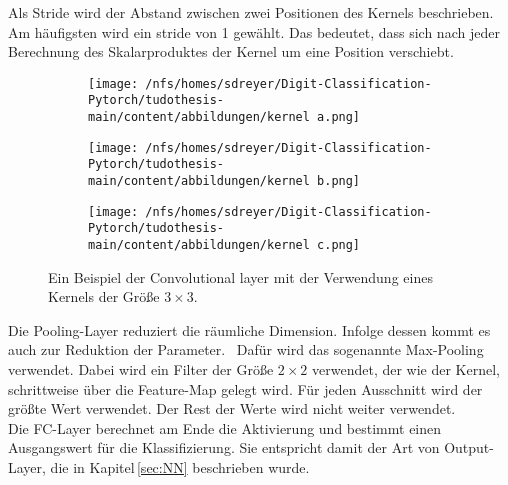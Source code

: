 Als Stride wird der Abstand zwischen zwei Positionen des Kernels beschrieben. Am häufigsten wird ein stride von 1 gewählt. 
Das bedeutet, dass sich nach jeder Berechnung des Skalarproduktes der Kernel um eine Position verschiebt.
\begin{figure}[H]
  \centering
  \begin{subfigure}[b]{0.3\textwidth}
    \texttt{[image: /nfs/homes/sdreyer/Digit-Classification-Pytorch/tudothesis-main/content/abbildungen/kernel a.png]}
    \label{}
  \end{subfigure}
  \hfill
  \begin{subfigure}[b]{0.3\textwidth}
    \texttt{[image: /nfs/homes/sdreyer/Digit-Classification-Pytorch/tudothesis-main/content/abbildungen/kernel b.png]}
    \label{}
  \end{subfigure}
  \hfill
  \begin{subfigure}[b]{0.3\textwidth}
    \texttt{[image: /nfs/homes/sdreyer/Digit-Classification-Pytorch/tudothesis-main/content/abbildungen/kernel c.png]}
    \label{}
  \end{subfigure}
  \caption{Ein Beispiel der Convolutional layer mit der Verwendung eines Kernels der Größe $3 \times 3$.~\cite{Yamashita2018}}
  \label{fig:kernel}
\end{figure}
Die Pooling-Layer reduziert die räumliche Dimension. Infolge dessen kommt es auch zur Reduktion der Parameter.~\cite{datascience}
Dafür wird das sogenannte Max-Pooling verwendet. Dabei wird ein Filter der Größe $2 \times 2$ verwendet, der wie der Kernel, schrittweise über die Feature-Map gelegt wird.
Für jeden Ausschnitt wird der größte Wert verwendet. Der Rest der Werte wird nicht weiter verwendet.~\cite{Yamashita2018}\\
Die FC-Layer berechnet am Ende die Aktivierung und bestimmt einen Ausgangswert für die Klassifizierung.
Sie entspricht damit der Art von Output-Layer, die in Kapitel \ref{sec:NN} beschrieben wurde.

